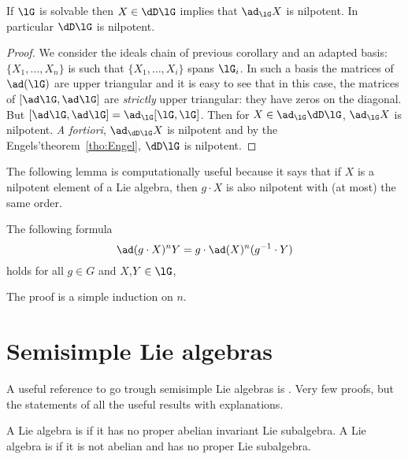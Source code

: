 \begin{corollary}
	If $\lG$ is solvable then $X\in\dD\lG$ implies that $\ad_{\lG}X$ is nilpotent. In particular $\dD\lG$ is nilpotent.
\end{corollary}

\begin{proof}
	We consider the ideals chain of previous corollary and an adapted basis: $\{X_1,\ldots,X_n\}$ is such that $\{X_1,\ldots,X_i\}$ spans $\lG_i$. In such a basis the matrices of $\ad(\lG)$ are upper triangular and it is easy to see that in this case, the matrices of $[\ad\lG,\ad\lG]$ are \emph{strictly} upper triangular: they have zeros on the diagonal. But $[\ad\lG,\ad\lG]=\ad_{\lG}[\lG,\lG]$. Then for $X\in\ad_{\lG}\dD\lG$, $\ad_{\lG}X$ is nilpotent. \emph{A fortiori}, $\ad_{\dD\lG}X$ is nilpotent and by the Engels'theorem~\ref{tho:Engel}, $\dD\lG$ is nilpotent.
\end{proof}

The following lemma is computationally useful because it says that if $X$ is a nilpotent element of a Lie algebra, then $g\cdot X$ is also nilpotent with (at most) the same order.

\begin{lemma}
	The following formula
	\begin{equation}
		\ad(g\cdot X)^nY=g\cdot \ad(X)^n(g^{-1}\cdot Y)
	\end{equation}
	holds for all $g\in G$ and $X$,$Y\in\lG$,
	\label{lem:nil_Ad}
\end{lemma}

The proof is a simple induction on $n$.

\section{Semisimple Lie algebras}

A useful reference to go trough semisimple Lie algebras is \cite{Wisser}. Very few proofs, but the statements of all the useful results with explanations.

\begin{definition}
	A Lie algebra is  if it has no proper abelian invariant Lie subalgebra. A Lie algebra is  if it is not abelian and has no proper Lie subalgebra.
\end{definition}

